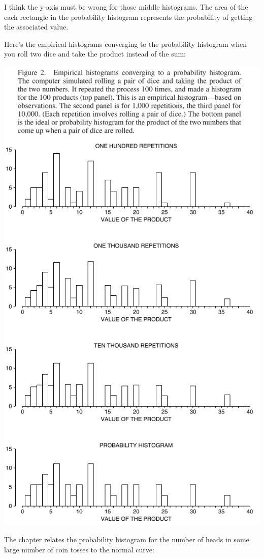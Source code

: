 \documentclass[
]{book}
\begin{document}
I think the y-axis must be wrong for those middle histograms. The area of the each rectangle in the probability histogram represents the probability of getting the associated value.

Here's the empirical histograms converging to the probability histogram when you roll two dice and take the product instead of the sum:

\includegraphics{images/Ch18Img02.png}

The chapter relates the probability histogram for the number of heads in some large number of coin tosses to the normal curve:
\end{document}

